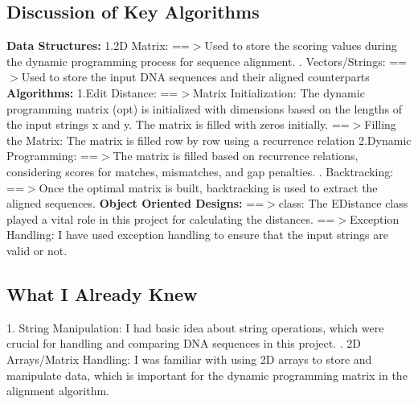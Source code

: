\documentclass[12pt]{article}
\begin{document}
\subsection{Discussion of Key Algorithms}
\textbf{Data Structures:}
\newline
1.2D Matrix:
\newline
==$>$Used to store the scoring values during the dynamic programming process for sequence alignment.
. Vectors/Strings:
\newline 
==$>$Used to store the input DNA sequences and their aligned counterparts
\newline 
\textbf{Algorithms:}
\newline
1.Edit Distance:
\newline 
==$>$Matrix Initialization: The dynamic programming matrix (opt) is initialized with dimensions based on the lengths of the input strings x and y. The matrix is filled with zeros initially.
\newline
==$>$Filling the Matrix: The matrix is filled row by row using a recurrence relation
\newline
2.Dynamic Programming:
\newline
==$>$The matrix is filled based on recurrence relations, considering scores for matches, mismatches, and gap penalties.
. Backtracking: 
\newline
==$>$Once the optimal matrix is built, backtracking is used to extract the aligned sequences.
\newline
\textbf{Object Oriented Designs:}
\newline
==$>$class:
\newline
The EDistance class played a vital role in this project for calculating the distances.
\newline
==$>$Exception Handling:
\newline
I have used exception handling to ensure that the input strings are valid or not.
\subsection{What I Already Knew}
1. String Manipulation:
\newline 
I had basic idea about string operations, which were crucial for handling and comparing DNA sequences in this project.
. 2D Arrays/Matrix Handling:
\newline
I was familiar with using 2D arrays to store and manipulate data, which is important for the dynamic programming matrix in the alignment algorithm.
\end{document}
